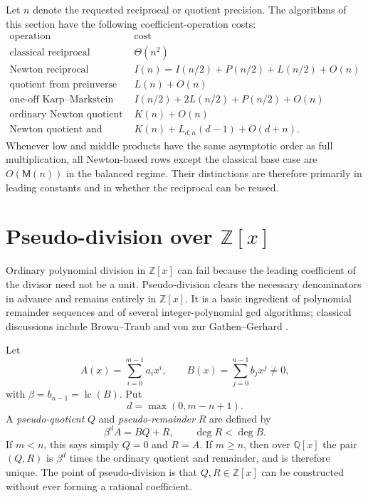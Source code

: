 \documentclass[11pt]{book}
\theoremstyle{definition}
\newcommand{\ZZ}{\mathbb Z}
\begin{document}
Let $n$ denote the requested reciprocal or quotient precision.  The algorithms
of this section have the following coefficient-operation costs:
\[
\begin{array}{c|c}
\text{operation} & \text{cost}\\
\hline
\text{classical reciprocal} & \Theta(n^2)\\
\text{Newton reciprocal} &
 I(n)=I(n/2)+P(n/2)+L(n/2)+O(n)\\
\text{quotient from preinverse} & L(n)+O(n)\\
\text{one-off Karp--Markstein quotient} &
 I(n/2)+2L(n/2)+P(n/2)+O(n)\\
\text{ordinary Newton quotient} & K(n)+O(n)\\
\text{Newton quotient and remainder} &
 K(n)+L_{d,n}(d-1)+O(d+n).
\end{array}
\]
Whenever low and middle products have the same asymptotic order as full
multiplication, all Newton-based rows except the classical base case are
$O(\mathsf M(n))$ in the balanced regime.  Their distinctions are therefore
primarily in leading constants and in whether the reciprocal can be reused.



\section{Pseudo-division over $\ZZ[x]$}\label{sec:pseudodivision}

Ordinary polynomial division in $\ZZ[x]$ can fail because the leading
coefficient of the divisor need not be a unit.  Pseudo-division clears the
necessary denominators in advance and remains entirely in $\ZZ[x]$.
It is a basic ingredient of polynomial remainder sequences and of several
integer-polynomial gcd algorithms; classical discussions include
Brown--Traub \cite{BrownTraub1971} and von zur Gathen--Gerhard
\cite{vonZurGathenGerhard2013}.

Let
\[
 A(x)=\sum_{i=0}^{m-1}a_i x^i,
 \qquad
 B(x)=\sum_{j=0}^{n-1}b_j x^j\ne0,
\]
with $\beta=b_{n-1}=\operatorname{lc}(B)$.  Put
\[
 d=\max(0,m-n+1).
\]
A \emph{pseudo-quotient} $Q$ and \emph{pseudo-remainder} $R$ are defined by
\begin{equation}\label{eq:pseudodiv-identity}
 \beta^d A=BQ+R,
 \qquad
 \deg R<\deg B.
\end{equation}
If $m<n$, this says simply $Q=0$ and $R=A$.  If $m\ge n$, then over
$\mathbb Q[x]$ the pair $(Q,R)$ is $\beta^d$ times the ordinary quotient and
remainder, and is therefore unique.  The point of pseudo-division is that
$Q,R\in\ZZ[x]$ can be constructed without ever forming a rational
coefficient.
\end{document}
